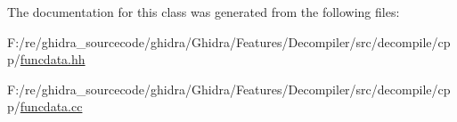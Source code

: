The documentation for this class was generated from the following files\+:\begin{DoxyCompactItemize}
\item 
F\+:/re/ghidra\+\_\+sourcecode/ghidra/\+Ghidra/\+Features/\+Decompiler/src/decompile/cpp/\mbox{\hyperlink{funcdata_8hh}{funcdata.\+hh}}\item 
F\+:/re/ghidra\+\_\+sourcecode/ghidra/\+Ghidra/\+Features/\+Decompiler/src/decompile/cpp/\mbox{\hyperlink{funcdata_8cc}{funcdata.\+cc}}\end{DoxyCompactItemize}
